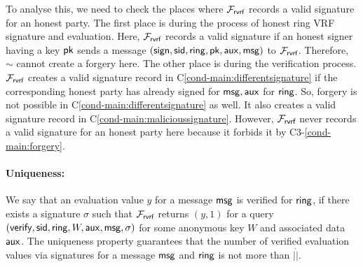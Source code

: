 	To analyse this, we need to check the places where $ \mathcal{F}_{\textsf{rvrf}} $ records a valid signature for an honest party. The first place is during the process of honest ring VRF signature and evaluation. Here, $ \mathcal{F}_{\textsf{rvrf}} $ records a valid signature if an honest signer having a key $ \mathsf{pk} $ sends a message $ (\mathsf{sign}, \textsf{sid},\mathsf{ring},\mathsf{pk},\mathsf{aux},\mathsf{msg}) $ to $ \mathcal{F}_{\textsf{rvrf}} $. Therefore, 	$ \sim $ cannot create a forgery here.
	The other place is during the verification process. $ \mathcal{F}_{\textsf{rvrf}} $ creates a valid signature record in C\ref{cond-main:differentsignature} if the corresponding honest party has already signed for $ \mathsf{msg}, \mathsf{aux} $ for $ \mathsf{ring} $. So, forgery is not possible  in C\ref{cond-main:differentsignature} as well. It also creates a valid signature record in C\ref{cond-main:malicioussignature}. However, $ \mathcal{F}_{\textsf{rvrf}} $ never records a valid signature  for an honest party here because it forbids it by C3-\ref{cond-main:forgery}.
	
	
	
	\paragraph{Uniqueness:} We say that an evaluation value $ y $ for a message $ \mathsf{msg} $  is verified for $ \mathsf{ring} $, if there exists a signature $ \sigma $ such that $ \mathcal{F}_{\textsf{rvrf}}$ returns $ (y, 1)$ for a query $ (\mathsf{verify}, \textsf{sid}, \mathsf{ring},W,\mathsf{aux},\mathsf{msg},\sigma)$ for some anonymous key $ W $ and associated data $\mathsf{aux} $. The uniqueness property guarantees that the number of verified evaluation values via signatures for a message $ \mathsf{msg} $ and $ \mathsf{ring} $ is not more than $ |\ring| $.
	
